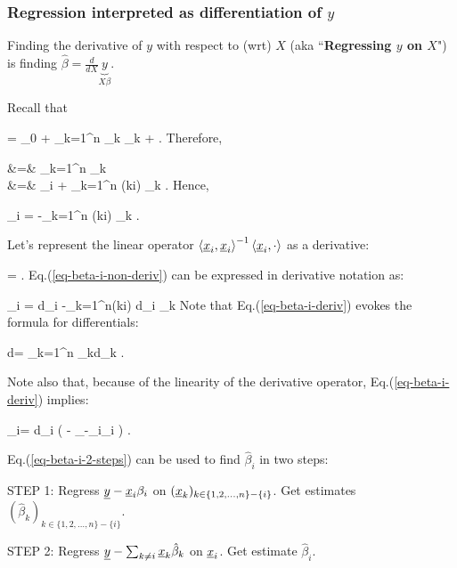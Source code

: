 \subsubsection{Regression
 interpreted as differentiation
 of $y$}

Finding the derivative of $y$
with respect to (wrt) $X$
(aka ``{\bf Regressing $y$ on $X$}")
is finding 
$\hat{\beta}=\frac{d}{dX}
\underbrace{y}_{X\beta}$.

Recall that

\beq
\rvy = \beta_0 + \sum_{k=1}^n \rvx_k \beta_k + \ul{\eps}
\;.
\eeq
Therefore,

\beqa
{}
&=& 
\sum_{k=1}^n \beta_k
\\
&=&
 \beta_i
+
\sum_{k=1}^n
\indi(k\neq i)
 \beta_k
\;.
\eeqa
Hence,

\beq
\beta_i
=
{}
-\sum_{k=1}^n
\indi(k\neq i)
{}
\beta_k
\;.
\label{eq-beta-i-non-deriv}
\eeq

Let's represent 
the linear 
operator
$\left\langle{\underline{x}}_i, {\underline{x}}_i\right\rangle^{-1}\left\langle{\underline{x}}_i, \cdot\right\rangle
$ as a derivative:

\beq
{}=
{}
\;.
\eeq
Eq.(\ref{eq-beta-i-non-deriv})
can be expressed 
in derivative notation as:

\beq
\beta_i
=
{d\rvx_i}
-\sum_{k=1}^n\indi(k\neq i)
{d\rvx_i}
\beta_k
\label{eq-beta-i-deriv}
\eeq
Note that Eq.(\ref{eq-beta-i-deriv})
evokes the formula for differentials:

\beq
d\rvy=
\sum_{k=1}^n \beta_kd\rvx_k 
\;.
\eeq

Note also that,
because of the
linearity of the derivative operator,
Eq.(\ref{eq-beta-i-deriv})
implies:

\beq
\beta_i=
{d\rvx_i}
\left(\rvy
-
_{\rvy-\rvx_i\beta_i}
\right)
\label{eq-beta-i-2-steps}
\;.
\eeq

Eq.(\ref{eq-beta-i-2-steps})
can be used to find
$\hat{\beta}_i$ 
in two steps:

STEP 1: Regress ${\underline{y}}-{\underline{x}}_i\beta_i$
on $({\underline{x}}_k)_{k\in \{1,2, 
\ldots, n\}- \{ i\}}$.
Get estimates
$(\hat{\beta}_k)_{k\in \{1,2, 
\ldots, n\}- \{ i\}}$. 

STEP 2: Regress ${\underline{y}}-\sum_{k\neq i} {\underline{x}}_k\hat{\beta}_k$ on ${\underline{x}}_i$.
Get estimate $\hat{\beta}_i$.

